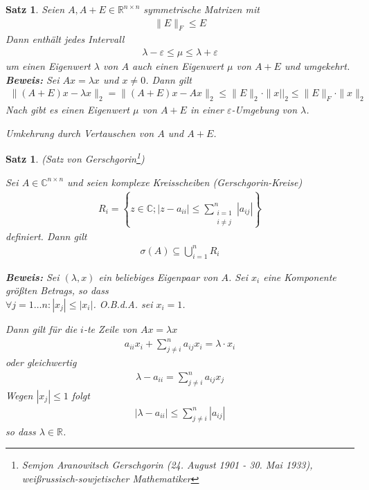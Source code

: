 \documentclass[%
a4paper,
11pt,		%
]
{scrartcl}
\newcommand{\R}{\mathbb{R}}
\newcommand{\C}{\mathbb{C}}
\theoremstyle{plain}
\theoremstyle{plain}
\newtheorem{mysatz}[mydef]{Satz}
\theoremstyle{plain}
\theoremstyle{plain}
\begin{document}
\begin{mysatz}\label{satz:ewintervall}
Seien $A, A+E \in \R^{n \times n}$ symmetrische Matrizen mit
\begin{align*}
\| E \|_F \leq E
\end{align*}
Dann enthält jedes Intervall
\begin{align*}
\lambda - \varepsilon \leq \mu \leq \lambda + \varepsilon
\end{align*}
um einen Eigenwert $\lambda$ von $A$ auch einen Eigenwert $\mu$ von $A+E$ und umgekehrt.\\

\textbf{Beweis:} Sei $Ax=\lambda x$ und $x \neq 0$. Dann gilt
\begin{align*}
\| (A+E)x - \lambda x \|_2 = \| (A+E)x - Ax \|_2 \leq \|E\|_2 \cdot \|x||_2 \leq \|E\|_F \cdot \|x\|_2
\end{align*}
Nach  gibt es einen Eigenwert $\mu$ von $A+E$ in einer $\varepsilon$-Umgebung von $\lambda$.

Umkehrung durch Vertauschen von $A$ und $A+E$.
\end{mysatz}

\newpage

\begin{mysatz}(Satz von Gerschgorin\footnote{Semjon Aranowitsch Gerschgorin (24. August 1901 - 30. Mai 1933), weißrussisch-sowjetischer Mathematiker})

Sei $A \in \C^{n \times n}$ und seien komplexe Kreisscheiben \hfill (\textit{Gerschgorin-Kreise})
\begin{align*}
  R_i = \left\{ z \in \C; |z-a_{ii}| \leq \sum\limits_{\substack{i=1\\ i \neq j}}^n |a_{ij}| \right\}
\end{align*}
definiert. Dann gilt
\begin{align*}
\sigma(A) \subseteq \bigcup\limits_{i=1}^n R_i
\end{align*}

\textbf{Beweis:}
Sei $(\lambda,x)$ ein beliebiges Eigenpaar von $A$. Sei $x_i$ eine Komponente größten Betrags, so dass\\
$\forall j=1\dots n: |x_j| \leq |x_i| $. O.B.d.A. sei $x_i=1$.

Dann gilt für die $i$-te Zeile von $Ax = \lambda x$
\begin{align*}
  a_{ii} x_i + \sum\limits_{j \neq i}^n a_{ij} x_i = \lambda \cdot x_i
\end{align*}
oder gleichwertig
\begin{align*}
  \lambda - a_{ii} = \sum\limits_{j \neq i}^n a_{ij} x_j
\end{align*}
Wegen $|x_j| \leq 1$ folgt
\begin{align*}
  |\lambda - a_{ii}| \leq \sum\limits_{j \neq i}^n |a_{ij}|
\end{align*}
so dass $\lambda \in \R$.
\end{mysatz}
\end{document}
